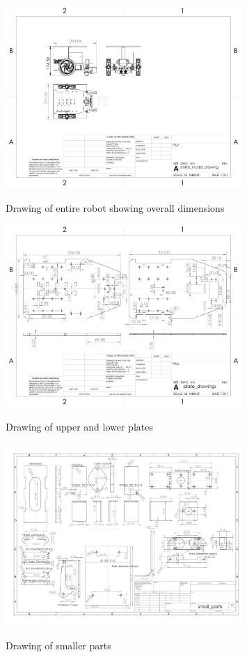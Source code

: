 \documentclass{article}
\begin{document}
\begin{figure}[H]
    \centering
    \includegraphics[width=0.8\textwidth]{assets/entire_model_drawing.JPG}
    \label{fig:entire_model_drawing}
    \caption{Drawing of entire robot showing overall dimensions}
\end{figure}

\begin{figure}[H]
    \centering
    \includegraphics[width=0.8\textwidth]{assets/plate_drawings.JPG}
    \label{fig:plate_drawings}
    \caption{Drawing of upper and lower plates}
\end{figure}

\begin{figure}[H]
    \centering
    \includegraphics[width=0.8\textwidth]{assets/small_parts.JPG}
    \label{fig:smaller_parts}
    \caption{Drawing of smaller parts}
\end{figure}
\end{document}

